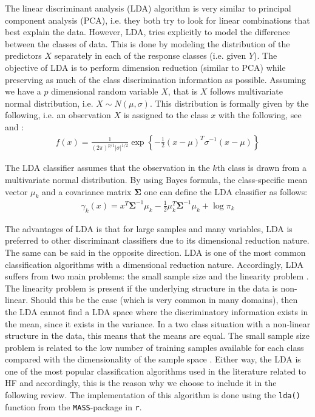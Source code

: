 \documentclass[../thesis.tex]{subfiles}
\begin{document}
\noindent The linear discriminant analysis (LDA) algorithm is very similar to principal component analysis (PCA), i.e. they both try to look for linear combinations that best explain the data. However, LDA, tries explicitly to model the difference between the classes of data. This is done by modeling the distribution of the predictors $X$ separately in each of the response classes (i.e. given $Y$). The objective of LDA is to perform dimension reduction (similar to PCA) while preserving as much of the class discrimination information as possible. Assuming we have a $p$ dimensional random variable $X$, that is $X$ follows multivariate normal distribution, i.e. $X \sim N(\mu,\sigma)$. This distribution is formally given by the following, i.e. an observation $X$ is assigned to the class $x$ with the following, see \cite{friedman2009elements} and \cite{james2013introduction}:
\begin{align}
    f(x) = \frac{1}{(2\pi)^{p / 1}|\sigma|^{1/2}} \exp\left \{-\frac{1}{2}(x-\mu)^T \sigma^{-1} (x - \mu) \right \}
\end{align}

\noindent The LDA classifier assumes that the observation in the $k$th class is drawn from a multivariate normal distribution. By using Bayes formula, the class-specific mean vector $\mu_k$ and a covariance matrix $\boldsymbol{\Sigma}$ one can define the LDA classifier as follows:
\begin{align}
    \gamma_k (x) = x^T\boldsymbol{\Sigma}^{-1} \mu_k - \frac{1}{2}\mu_k^T\boldsymbol{\Sigma}^{-1} \mu_k + \log \pi_k
\end{align}

\noindent The advantages of LDA is that for large samples and many variables, LDA is preferred to other discriminant classifiers due to its dimensional reduction nature. The same can be said in the opposite direction. LDA is one of the most common classification algorithms with a dimensional reduction nature. Accordingly, LDA suffers from two main problems: the small sample size and the linearity problem \citep{tharwat2017linear}. The linearity problem is present if the underlying structure in the data is non-linear. Should this be the case (which is very common in many domains), then the LDA cannot find a LDA space where the discriminatory information exists in the mean, since it exists in the variance. In a two class situation with a non-linear structure in the data, this means that the means are equal. The small sample size problem is related to the low number of training samples available for each class compared with the dimensionality of the sample space \citep{tharwat2017linear}. Either way, the LDA is one of the most popular classification algorithms used in the literature related to HF and accordingly, this is the reason why we choose to include it in the following review. The implementation of this algorithm is done using the \texttt{lda()} function from the \texttt{MASS}-package in \texttt{r}.
\end{document}
